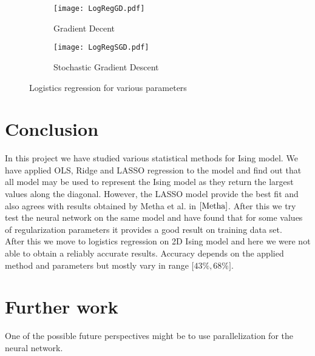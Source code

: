 \documentclass[10pt]{article}
\begin{document}
	\begin{figure}
	\centering
	
	\begin{subfigure}[b]{0.9\textwidth}  
		\centering 
		\texttt{[image: LogRegGD.pdf]}
		\caption[]%
		{{\small Gradient Decent}}    
		\label{fig:LogRegGD}
	\end{subfigure}
	\hfill
	\begin{subfigure}[b]{0.9\textwidth}   
		\centering 
		\texttt{[image: LogRegSGD.pdf]}
		\caption[]%
		{{\small Stochastic Gradient Descent}}    
		\label{fig:LogRegS}
	\end{subfigure}
	\quad
	\caption[ The average and standard deviation of critical parameters ]
	{\small Logistics regression for various parameters} 
	\label{fig:LogReg}
\end{figure}



\section{Conclusion}
In this project we have studied various statistical methods for Ising model. We have applied OLS, Ridge and LASSO regression to the model and find out that all model may be used to represent the Ising model as they return the largest values along the diagonal. However, the LASSO model provide the best fit and also agrees with results obtained by Metha et al. in $\cite{Metha}$. 
After this we try test the neural network on the same model and have found that for some values of regularization parameters it provides a good result on training data set. \\
After this we move to logistics regression on 2D Ising model and here we were not able to obtain a reliably accurate results. Accuracy depends on the applied method and parameters but mostly vary in range $\lbrack 43\% , 68\% \rbrack$.\\

\section{Further work}
One of the possible future perspectives might be to use parallelization for the neural network.
\end{document}

